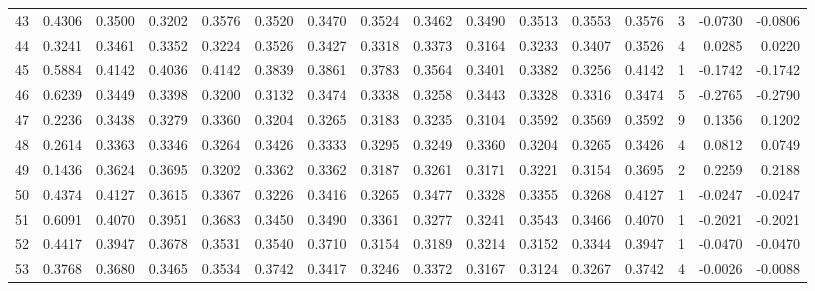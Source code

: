 \begin{tabular}{lrrrrrrrrrrrrrrr}
43  &      0.4306 &  0.3500 &  0.3202 &  0.3576 &  0.3520 &  0.3470 &  0.3524 &  0.3462 &  0.3490 &  0.3513 &   0.3553 &     0.3576 &      3 &                   -0.0730 &                    -0.0806 \\
44  &      0.3241 &  0.3461 &  0.3352 &  0.3224 &  0.3526 &  0.3427 &  0.3318 &  0.3373 &  0.3164 &  0.3233 &   0.3407 &     0.3526 &      4 &                    0.0285 &                     0.0220 \\
45  &      0.5884 &  0.4142 &  0.4036 &  0.4142 &  0.3839 &  0.3861 &  0.3783 &  0.3564 &  0.3401 &  0.3382 &   0.3256 &     0.4142 &      1 &                   -0.1742 &                    -0.1742 \\
46  &      0.6239 &  0.3449 &  0.3398 &  0.3200 &  0.3132 &  0.3474 &  0.3338 &  0.3258 &  0.3443 &  0.3328 &   0.3316 &     0.3474 &      5 &                   -0.2765 &                    -0.2790 \\
47  &      0.2236 &  0.3438 &  0.3279 &  0.3360 &  0.3204 &  0.3265 &  0.3183 &  0.3235 &  0.3104 &  0.3592 &   0.3569 &     0.3592 &      9 &                    0.1356 &                     0.1202 \\
48  &      0.2614 &  0.3363 &  0.3346 &  0.3264 &  0.3426 &  0.3333 &  0.3295 &  0.3249 &  0.3360 &  0.3204 &   0.3265 &     0.3426 &      4 &                    0.0812 &                     0.0749 \\
49  &      0.1436 &  0.3624 &  0.3695 &  0.3202 &  0.3362 &  0.3362 &  0.3187 &  0.3261 &  0.3171 &  0.3221 &   0.3154 &     0.3695 &      2 &                    0.2259 &                     0.2188 \\
50  &      0.4374 &  0.4127 &  0.3615 &  0.3367 &  0.3226 &  0.3416 &  0.3265 &  0.3477 &  0.3328 &  0.3355 &   0.3268 &     0.4127 &      1 &                   -0.0247 &                    -0.0247 \\
51  &      0.6091 &  0.4070 &  0.3951 &  0.3683 &  0.3450 &  0.3490 &  0.3361 &  0.3277 &  0.3241 &  0.3543 &   0.3466 &     0.4070 &      1 &                   -0.2021 &                    -0.2021 \\
52  &      0.4417 &  0.3947 &  0.3678 &  0.3531 &  0.3540 &  0.3710 &  0.3154 &  0.3189 &  0.3214 &  0.3152 &   0.3344 &     0.3947 &      1 &                   -0.0470 &                    -0.0470 \\
53  &      0.3768 &  0.3680 &  0.3465 &  0.3534 &  0.3742 &  0.3417 &  0.3246 &  0.3372 &  0.3167 &  0.3124 &   0.3267 &     0.3742 &      4 &                   -0.0026 &                    -0.0088 \\

\end{tabular}
